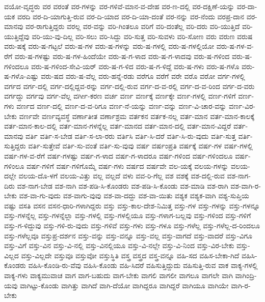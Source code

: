 {ವಯೋ-ವೃದ್ಧರು
ವರ
ವರಂತೆ
ವರ-ಗಳನ್ನು
ವರ-ಗಳಿವೆ-ಮಾನ-ವ-ದೇಹ
ವರ-ಣ-ದಲ್ಲಿ
ವರ-ದಕ್ಷಿಣೆ-ಯನ್ನು
ವರ-ದಾ-ಯಕ
ವರದಿ
ವರ-ದಿ-ಯಾಗುತ್ತಿ-ರುವ
ವರ-ದಿ-ಯಾದ
ವರ-ದಿ-ಯಾ-ದಂತೆ
ವರ-ನನ್ನು
ವರ-ನೆಂದು
ವರಪ್ರ-ದಾನ
ವರ-ಮಾನವು
ವರ-ರಾಗುತ್ತಿದ್ದರು
ವರಲ್ಲ
ವರ-ವನ್ನು
ವರಿ-ಗಿಂತಲೂ
ವರಿಗೆ
ವರಿ-ದಂತೆಲ್ಲ
ವರಿ-ದರು
ವರಿ-ಯುತ್ತಿದೆ
ವರಿ-ಯುತ್ತಿದ್ದೆವು
ವರಿ-ಯು-ವು-ದಿಲ್ಲ
ವರಿ-ಸಲು
ವರಿ-ಸಿದ್ದು
ವರಿ-ಸುತ್ತ
ವರಿ-ಸುವಳು
ವರಿ-ಸೋಣ
ವರು
ವರುಣ
ವರುಷ
ವರು-ಷಕ್ಕೆ
ವರು-ಷ-ಗಟ್ಟಲೆ
ವರು-ಷ-ಗಳ
ವರು-ಷ-ಗಳನ್ನು
ವರು-ಷ-ಗಳಲ್ಲಿ
ವರು-ಷ-ಗಳಲ್ಲಿಯೋ
ವರು-ಷ-ಗಳ-ವ-ರೆಗೆ
ವರು-ಷ-ಗಳಷ್ಟು
ವರು-ಷ-ಗಳ-ಹಿಂದೆಯೇ
ವರು-ಷ-ಗ-ಳಾದ
ವರು-ಷ-ಗ-ಳಾದವು
ವರು-ಷ-ಗಳಿಂದ
ವರು-ಷ-ಗಳಿಂದಲೂ
ವರು-ಷ-ಗಳಿಂದ-ಸೇವಿ-ಯರ್
ವರು-ಷ-ಗ-ಳಿದ
ವರು-ಷ-ಗ-ಳಿದ್ದೆ
ವರು-ಷ-ಗಳು
ವರು-ಷ-ಗಳೊ
ವರು-ಷ-ಗಳೊ-ಎಷ್ಟು
ವರು-ಷದ
ವರು-ಷ-ವೆಲ್ಲ
ವರು-ಹನ್ನೆ-ರಡು
ವರೆಗೂ
ವರೆಗೆ
ವರೇ
ವರೊ
ವರೋ
ವರ್ಗ-ಗಳಲ್ಲಿ
ವರ್ಗದ
ವರ್ಗ-ದಲ್ಲಿ
ವರ್ಗ-ದಲ್ಲಿದ್ದವ-ರನ್ನು
ವರ್ಗ-ದಲ್ಲಿ-ರುವ
ವರ್ಗ-ದ-ವ-ರಲ್ಲಿ
ವರ್ಗ-ದ-ವ-ರಿಂದ
ವರ್ಗ-ದ-ವರು
ವರ್ಗದ್ದು
ವರ್ಗವು
ವರ್ಗ-ವೆಲ್ಲ
ವರ್ಗೀ-ಕರಣ
ವರ್ಚ
ವರ್ಣ
ವರ್ಣಕ್ಕೆ
ವರ್ಣಕ್ಕೇ
ವರ್ಣ-ಗಳಲ್ಲಿ
ವರ್ಣ-ಗಳಿಗೆ
ವರ್ಣ-ಗಳು
ವರ್ಣದ
ವರ್ಣ-ದಲ್ಲಿ
ವರ್ಣ-ದ-ವ-ರಿಗೂ
ವರ್ಣ-ನೆ-ಯನ್ನು
ವರ್ಣ-ವನ್ನು
ವರ್ಣ-ವಿ-ಚಾರ-ವನ್ನು
ವರ್ಣ-ವಿರ-ಬೇಕು
ವರ್ಣವೇ
ವರ್ಣವ್ಯವಸ್ಥೆ
ವರ್ಣಾತೀತ
ವರ್ಣಾಶ್ರಮ
ವರ್ತಕನ
ವರ್ತಕ-ನಲ್ಲ
ವರ್ತ-ಮಾನ
ವರ್ತ-ಮಾನ-ಕಾಲಕ್ಕೆ
ವರ್ತ-ಮಾನ-ಕಾಲ-ದಲ್ಲಿ
ವರ್ತ-ಮಾನ-ಗಳನ್ನೆಲ್ಲ
ವರ್ತ-ಮಾನದ
ವರ್ತ-ಮಾನ-ದಲ್ಲಿ
ವರ್ತ-ಮಾನ-ವಿದ್ದರೆ
ವರ್ತ-ಮಾನವು
ವರ್ತಿ
ವರ್ತಿ-ಸ-ಬೇಡ
ವರ್ತಿ-ಸ-ಲಾ-ರರು
ವರ್ತಿಸಿ
ವರ್ತಿ-ಸಿ-ದರೆ
ವರ್ತಿ-ಸಿ-ರು-ವುದು
ವರ್ತಿ-ಸುತ್ತ
ವರ್ತಿ-ಸುತ್ತಿದ್ದರು
ವರ್ತಿ-ಸುತ್ತೇವೆ
ವರ್ತಿ-ಸು-ವಂತೆ
ವರ್ತಿ-ಸು-ವುವು
ವರ್ಷ
ವರ್ಷಂಪ್ರತಿ
ವರ್ಷಕ್ಕೆ
ವರ್ಷ-ಗಳ
ವರ್ಷ-ಗಳಲ್ಲಿ
ವರ್ಷ-ಗಳ-ವ-ರೆಗೆ
ವರ್ಷ-ಗಳಷ್ಟು
ವರ್ಷ-ಗ-ಳಾದ
ವರ್ಷ-ಗ-ಳಾದರೂ
ವರ್ಷ-ಗಳಿಂದ
ವರ್ಷ-ಗಳಿಂದಲೂ
ವರ್ಷ-ಗಳಿಂಲೂ
ವರ್ಷ-ಗಳಿಗೆ
ವರ್ಷ-ಗಳಿಗೊಮ್ಮೆ
ವರ್ಷ-ಗಳು
ವರ್ಷದ
ವರ್ಷವೇ
ವಲ-ಯಕ್ಕೆ
ವಲಯ-ಗಳನ್ನು
ವಲಯ-ದಲ್ಲೇ
ವಲಯ-ದೊ-ಳಗೆ
ವಲಯ-ವಿತ್ತು
ವಲ್ಲ
ವಲ್ಲದೆ
ವಳು
ವವ-ರಿ-ಗೆಲ್ಲ
ವಶ
ವಶಕ್ಕೆ
ವಶ-ದಲ್ಲಿ-ರುವ
ವಶ-ನಾಗ-ದಿರು
ವಶ-ನಾಗ-ಬೇಡ
ವಶ-ನಾಗಿ
ವಶ-ಪಡಿ-ಸಿ-ಕೊಂಡರು
ವಶ-ಪಡಿ-ಸಿ-ಕೊಂಡು
ವಶ-ಮಾಡಿ
ವಶ-ರಾಗಿ
ವಶ-ವಾಗಿ-ರ-ಬೇಕು
ವಶ-ವಾ-ಗು-ವುದು
ವಶ-ವಾಗು-ವುವು
ವಶ-ವಾ-ದದ್ದು
ವಶ-ವಾ-ಯಿತು
ವಶ್ಯಕ
ವಶ್ಯಕ-ವಾಗಿ
ವಶ್ಯ-ಸುಪ್ತಿಯ
ವಷ್ಟು
ವಸತಿ
ವಸನ
ವಸನ-ಧಾರಿ-ಗಳಾಗಿದ್ದರು
ವಸ್ತು
ವಸ್ತು-ಕಾಲ-ದೇಶ-ನಿಮಿತ್ತ
ವಸ್ತು-ಗಳ
ವಸ್ತು-ಗಳನ್ನು
ವಸ್ತು-ಗಳನ್ನೂ
ವಸ್ತು-ಗಳನ್ನೆಲ್ಲ
ವಸ್ತು-ಗಳನ್ನೆಲ್ಲಾ
ವಸ್ತು-ಗಳಲ್ಲಿ
ವಸ್ತು-ಗಳಲ್ಲಿಯೂ
ವಸ್ತು-ಗಳಾಗ-ಬಲ್ಲವು
ವಸ್ತು-ಗಳಿಂದ
ವಸ್ತು-ಗಳಿಗೆ
ವಸ್ತು-ಗ-ಳಿದ್ದುವು
ವಸ್ತು-ಗಳಿ-ರು-ವುದು
ವಸ್ತು-ಗಳಿವೆ
ವಸ್ತು-ಗಳು
ವಸ್ತು-ಗಳೂ
ವಸ್ತು-ಗಳೆಲ್ಲ
ವಸ್ತು-ಗಳೆಲ್ಲ-ದ-ರಿಂದಲೂ
ವಸ್ತು-ಗಳೆಲ್ಲವೂ
ವಸ್ತುಪ್ರ-ದರ್ಶನ
ವಸ್ತು-ವನ್ನು
ವಸ್ತು-ವನ್ನೂ
ವಸ್ತು-ವಲ್ಲ
ವಸ್ತು-ವಾಗದೆ
ವಸ್ತು-ವಾದರೆ
ವಸ್ತು-ವಿಗೂ
ವಸ್ತು-ವಿಗೆ
ವಸ್ತು-ವಿನ
ವಸ್ತು-ವಿ-ನಲ್ಲಿ
ವಸ್ತು-ವಿನಲ್ಲಿಯೂ
ವಸ್ತು-ವಿ-ನಲ್ಲೇ
ವಸ್ತು-ವಿ-ನಿಂದ
ವಸ್ತು-ವಿರ-ಬೇಕು
ವಸ್ತು-ವಿಲ್ಲದ
ವಸ್ತು-ವಿಲ್ಲದೇ
ವಸ್ತುವೂ
ವಸ್ತುವೋ
ವಸ್ತುಸ್ಥಿತಿ
ವಸ್ತ್ರ
ವಸ್ತ್ರದ
ವಸ್ತ್ರ-ವನ್ನೂ
ವಹಿ-ಸದ
ವಹಿಸ-ಬೇಕಾ-ಗಿದೆ
ವಹಿಸಿ-ಕೊಂಡರು
ವಹಿಸಿ-ಕೊಂಡಿ-ರು-ವೆವು
ವಹಿಸಿ-ಕೊಂಡು
ವಹಿ-ಸಿದರೆ
ವಹಿಸುತ್ತಿದ್ದುದು
ವಹಿಸುತ್ತಿ-ರುವ
ವಾಕ
ವಾಕ್ಯ-ಗಳಲ್ಲಿ
ವಾಕ್ಯ-ಗಳು
ವಾಕ್ಯಮುವಾಚ
ವಾಗ
ವಾಗ-ಬಹುದು
ವಾಗ-ಬೇಕು
ವಾಗಲಿ
ವಾಗಲೀ
ವಾಗಲೂ
ವಾಗಲೇ
ವಾಗಿ
ವಾಗಿಂದ್ರಿ-ಯವು
ವಾಗಿಟ್ಟು-ಕೊಂಡು
ವಾಗಿತ್ತು
ವಾಗಿದೆ
ವಾಗಿ-ದೆಯೋ
ವಾಗಿದ್ದರೂ
ವಾಗಿದ್ದರೆ
ವಾಗಿಯೂ
ವಾಗಿಯೇ
ವಾಗಿ-ರ-ಬೇಕು
}

